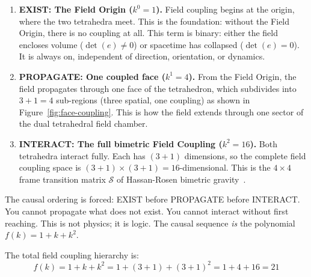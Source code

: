 \documentclass[aps,prd,preprint,superscriptaddress,showpacs,preprintnumbers,amsmath,amssymb,nofootinbib]{revtex4-2}
\begin{document}
\begin{enumerate}
\item \textbf{EXIST: The Field Origin ($k^0 = 1$).} Field coupling begins at the origin, where the two tetrahedra meet. This is the foundation: without the Field Origin, there is no coupling at all. This term is binary: either the field encloses volume ($\det(e) \neq 0$) or spacetime has collapsed ($\det(e) = 0$). It is always on, independent of direction, orientation, or dynamics.

\item \textbf{PROPAGATE: One coupled face ($k^1 = 4$).} From the Field Origin, the field propagates through one face of the tetrahedron, which subdivides into $3 + 1 = 4$ sub-regions (three spatial, one coupling) as shown in Figure~\ref{fig:face-coupling}. This is how the field extends through one sector of the dual tetrahedral field chamber.

\item \textbf{INTERACT: The full bimetric Field Coupling ($k^2 = 16$).} Both tetrahedra interact fully. Each has $(3{+}1)$ dimensions, so the complete field coupling space is $(3{+}1) \times (3{+}1) = 16$-dimensional. This is the $4 \times 4$ frame transition matrix $\mathcal{S}$ of Hassan-Rosen bimetric gravity~\cite{hassan2012}.
\end{enumerate}

The causal ordering is forced: EXIST before PROPAGATE before INTERACT. You cannot propagate what does not exist. You cannot interact without first reaching. This is not physics; it is logic. The causal sequence \emph{is} the polynomial $f(k) = 1 + k + k^2$.

The total field coupling hierarchy is:
\begin{equation}
f(k) = 1 + k + k^2 = 1 + (3{+}1) + (3{+}1)^2 = 1 + 4 + 16 = 21
\label{eq:polynomial}
\end{equation}
\end{document}
